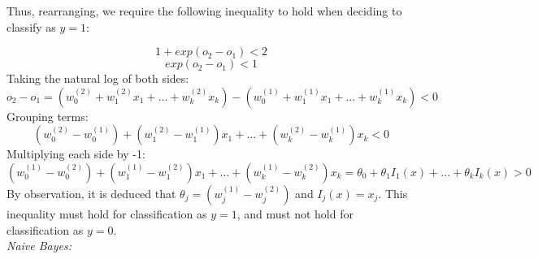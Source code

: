 \documentclass{article}
\begin{document}
Thus, rearranging, we require the following inequality to hold when deciding to classify as $y=1$:

$$1+exp(o_2-o_1)<2$$
$$exp(o_2-o_1)<1$$
Taking the natural log of both sides:
$$o_2-o_1=(w_0^{(2)}+w_1^{(2)}x_1+...+w_k^{(2)}x_k)-(w_0^{(1)}+w_1^{(1)}x_1+...+w_k^{(1)}x_k)<0$$
Grouping terms:
$$(w_0^{(2)}-w_0^{(1)})+(w_1^{(2)}-w_1^{(1)})x_1+...+(w_k^{(2)}-w_k^{(1)})x_k<0$$
Multiplying each side by -1:
$$(w_0^{(1)}-w_0^{(2)})+(w_1^{(1)}-w_1^{(2)})x_1+...+(w_k^{(1)}-w_k^{(2)})x_k=\theta_0+\theta_1I_1(x)+...+\theta_k I_k(x)>0$$
By observation, it is deduced that $\theta_j=(w_j^{(1)}-w_j^{(2)})$ and $I_j(x)=x_j$. This inequality must hold for classification as $y=1$, and must not hold for classification as $y=0$.\\

\textit{Naive Bayes:}\\





\end{document}
